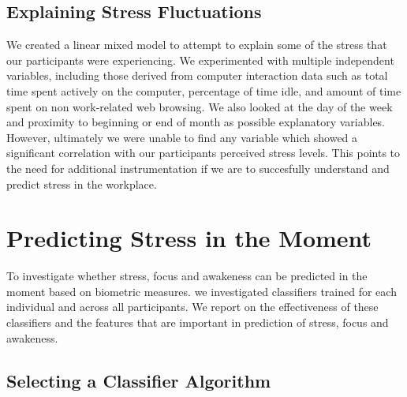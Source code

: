 \subsection{Explaining Stress Fluctuations}
We created a linear mixed model to attempt to explain some of the
stress that our participants were experiencing. We experimented with
multiple independent variables, including those derived from computer
interaction data such as total time spent actively on the computer,
percentage of time idle, and amount of time spent on non work-related
web browsing. We also looked at the day of the week and proximity to
beginning or end of month as possible explanatory variables. However,
ultimately we were unable to find any variable which showed a
significant correlation with our participants perceived stress
levels. This points to the need for additional instrumentation if we
are to succesfully understand and predict stress in the workplace.


\section{Predicting Stress in the Moment}
\label{secOverallAccuracy}

To investigate whether stress, focus and awakeness can be predicted in
the moment based on biometric measures.
we investigated classifiers trained
for each individual and across all participants. We report on the effectiveness of
these classifiers and the features that are important in prediction of stress, focus
and awakeness.

\subsection{Selecting a Classifier Algorithm}

